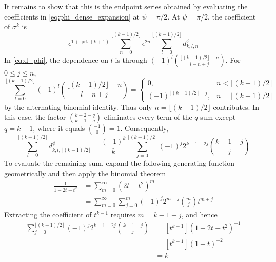 \documentclass[a4paper]{amsart}
\DeclareMathOperator{\prt}{prt}
\begin{document}
It remains to show that this is the endpoint series obtained by evaluating the coefficients in \eqref{eq:phi_dense_expansion} at $\psi=\pi/2$. At $\psi=\pi/2$, the coefficient of $\sigma^k$ is
\begin{equation*}
\epsilon^{1+\prt(k+1)}\sum_{n=0}^{\lfloor(k-1)/2\rfloor}\epsilon^{2n}
\sum_{l=0}^{\lfloor(k-1)/2\rfloor}d^\phi_{k,l,n}
\end{equation*}
In \eqref{eq:d_phi}, the dependence on $l$ is through
$(-1)^l\binom{\lfloor(k-1)/2\rfloor-n}{l-n+j}$. For $0\leq j\leq n$,
\begin{equation*}
\sum_{l=0}^{\lfloor(k-1)/2\rfloor}(-1)^l\binom{\lfloor(k-1)/2\rfloor-n}{l-n+j}
=
\begin{cases}
0, & n<\lfloor(k-1)/2\rfloor\\
(-1)^{\lfloor(k-1)/2\rfloor-j}, & n=\lfloor(k-1)/2\rfloor
\end{cases}
\end{equation*}
by the alternating binomial identity. Thus only $n=\lfloor(k-1)/2\rfloor$ contributes. In this case, the factor $\binom{k-2-q}{k-1-q}$ eliminates every term of the $q$-sum except $q=k-1$, where it equals $\binom{-1}{0}=1$. Consequently,
\begin{equation*}
\sum_{l=0}^{\lfloor(k-1)/2\rfloor}d^\phi_{k,l,\lfloor(k-1)/2\rfloor}
=\frac{(-1)^k}{k}\sum_{j=0}^{\lfloor(k-1)/2\rfloor}(-1)^j2^{k-1-2j}\binom{k-1-j}{j}
\end{equation*}
To evaluate the remaining sum, expand the following generating function geometrically and then apply the binomial theorem
\begin{align*}
\frac{1}{1-2t+t^2}
&=\sum_{m=0}^{\infty}(2t-t^2)^m\\
&=\sum_{m=0}^{\infty}\sum_{j=0}^{m}(-1)^j2^{m-j}\binom{m}{j}t^{m+j}
\end{align*}
Extracting the coefficient of $t^{k-1}$ requires $m=k-1-j$, and hence
\begin{align*}
\sum_{j=0}^{\lfloor(k-1)/2\rfloor}
(-1)^j2^{k-1-2j}\binom{k-1-j}{j}
&=[t^{k-1}](1-2t+t^2)^{-1}\\
&=[t^{k-1}](1-t)^{-2}\\
&=k
\end{align*}
\end{document}
